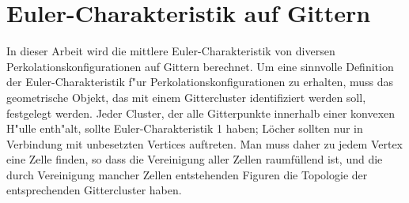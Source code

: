 \section{Euler-Charakteristik auf Gittern}
\label{sec:chimittel}
In dieser Arbeit wird die mittlere Euler-Charakteristik von diversen Perkolationskonfigurationen auf Gittern berechnet. Um eine sinnvolle Definition der Euler-Charakteristik f"ur Perkolationskonfigurationen zu erhalten, muss das geometrische Objekt, das mit einem Gittercluster identifiziert werden soll, festgelegt werden. Jeder Cluster, der alle Gitterpunkte innerhalb einer konvexen H"ulle enth"alt, sollte Euler-Charakteristik 1 haben; L\"ocher sollten nur in Verbindung mit unbesetzten Vertices auftreten. Man muss daher zu jedem Vertex eine Zelle finden, so dass die Vereinigung aller Zellen raumf\"ullend ist, und die durch Vereinigung mancher Zellen entstehenden Figuren die Topologie der entsprechenden Gittercluster haben.  
